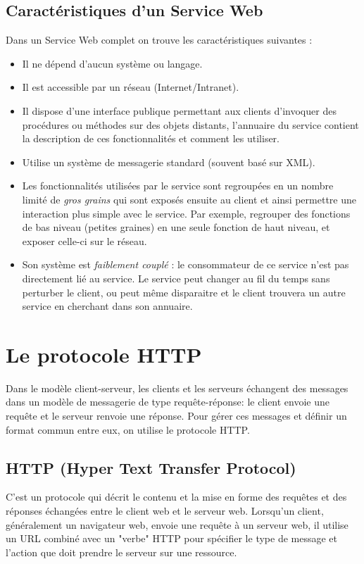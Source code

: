 \subsection{Caractéristiques d'un Service Web}
Dans un Service Web complet on trouve les caractéristiques suivantes :\cite{refTutorialPointsWS}
\begin{itemize}
	\item Il ne dépend d'aucun système ou langage.
	\item Il est accessible par un réseau (Internet/Intranet).
	\item Il dispose d'une interface publique permettant aux clients d'invoquer des procédures ou méthodes sur des objets distants, l'annuaire du service contient la description de ces fonctionnalités et comment les utiliser.
	\item Utilise un système de messagerie standard (souvent basé sur XML).
	\item Les fonctionnalités utilisées par le service sont regroupées en un nombre limité de \emph{gros grains} qui sont exposés ensuite au client et ainsi permettre une interaction plus simple avec le service. Par exemple, regrouper des fonctions de bas niveau (petites graines) en une seule fonction de haut niveau, et exposer celle-ci sur le réseau.
	\item Son système est \emph{faiblement couplé} : le consommateur de ce service n'est pas directement lié au service. Le service peut changer au fil du temps sans perturber le client, ou peut même disparaitre et le client trouvera un autre service en cherchant dans son annuaire.
\end{itemize}
		
\newpage
\section{Le protocole HTTP}
Dans le modèle client-serveur, les clients et les serveurs échangent des messages dans un modèle de messagerie de type requête-réponse: le client envoie une requête et le serveur renvoie une réponse.
Pour gérer ces messages et définir un format commun entre eux, on utilise le protocole HTTP.

\subsection{HTTP (Hyper Text Transfer Protocol)}
C'est un protocole qui décrit le contenu et la mise en forme des requêtes et des réponses échangées entre le client web et le serveur web. 
Lorsqu'un client, généralement un navigateur web, envoie une requête à un serveur web, il utilise un URL combiné avec un "verbe" HTTP pour spécifier le type de message et l'action que doit prendre le serveur sur une ressource.

